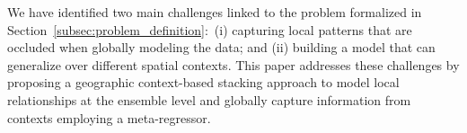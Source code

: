 \documentclass[runningheads]{llncs}
\begin{document}
We have identified two main challenges linked to the problem formalized in Section~\ref{subsec:problem_definition}:~(i) capturing local patterns that are occluded when globally modeling the data; and (ii) building a model that can generalize over different spatial contexts. This paper addresses these challenges by proposing a geographic context-based stacking approach to model local relationships at the ensemble level and globally capture information from contexts employing a meta-regressor.


\end{document}
